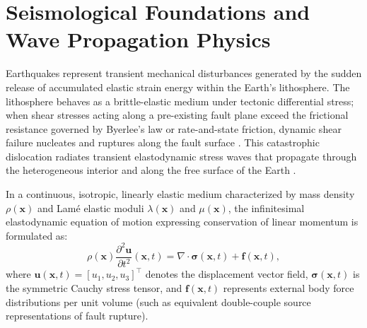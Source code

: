 
\label{chap:introduction}

\section{Seismological Foundations and Wave Propagation Physics}
\label{sec:wave_physics}

Earthquakes represent transient mechanical disturbances generated by the sudden
release of accumulated elastic strain energy within the Earth's lithosphere.
The lithosphere behaves as a brittle-elastic medium under tectonic differential
stress; when shear stresses acting along a pre-existing fault plane exceed the
frictional resistance governed by Byerlee's law or rate-and-state friction,
dynamic shear failure nucleates and ruptures along the fault surface
\parencite{Byerlee1978,Dieterich1979}. This catastrophic dislocation radiates
transient elastodynamic stress waves that propagate through the heterogeneous
interior and along the free surface of the Earth
\parencite{KanamoriBrodsky2004}.

In a continuous, isotropic, linearly elastic medium characterized by mass
density $\rho(\mathbf{x})$ and Lamé elastic moduli $\lambda(\mathbf{x})$ and
$\mu(\mathbf{x})$, the infinitesimal elastodynamic equation of motion
expressing conservation of linear momentum is formulated as:
\begin{equation}
  \rho(\mathbf{x}) \frac{\partial^2 \mathbf{u}}{\partial t^2}(\mathbf{x}, t) =
  \nabla \cdot \bm{\sigma}(\mathbf{x}, t) + \mathbf{f}(\mathbf{x}, t),
  \label{eq:momentum_conservation}
\end{equation}
where $\mathbf{u}(\mathbf{x}, t) = [u_1, u_2, u_3]^\top$ denotes the
displacement vector field, $\bm{\sigma}(\mathbf{x}, t)$ is the symmetric
Cauchy stress tensor, and $\mathbf{f}(\mathbf{x}, t)$ represents external body
force distributions per unit volume (such as equivalent double-couple source
representations of fault rupture).

